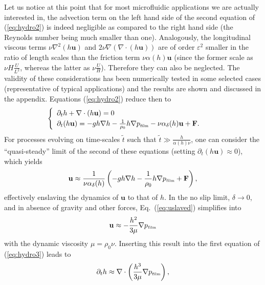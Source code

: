 Let us notice at this point that for most microfluidic applications we are actually interested in, the advection term on the left hand side of the second equation of (\ref{eq:hydro2}) is indeed negligible as compared to the right hand side (the Reynolds number \cite{reynoldsIIIExperimentalInvestigation1883,sommerfeldBeitrag1909} being much smaller than one).  
Analogously, the longitudinal viscous terms $\nu \nabla^2 (h\mathbf{u})$ and $2\nu \nabla (\nabla \cdot (h\mathbf{u}))$ are of order $\varepsilon^2$ smaller in the ratio of length scales than the friction term $\nu \alpha(h) \mathbf{u}$ (since the former scale as $\nu H\frac{U}{L^2}$, whereas the latter as $\nu \frac{U}{H}$).
Therefore they can also be neglected.
The validity of these considerations has been numerically tested in some selected cases (representative of typical applications) and the results are shown and discussed in the appendix.
Equations (\ref{eq:hydro2}) reduce then to
\begin{equation}\label{eq:hydro3}
  \begin{cases}
    \begin{array}{ll}
      \partial_t h + \nabla \cdot (h \mathbf{u})  = 0 & \\ 
      \partial_t (h \mathbf{u}) = -gh \nabla h -\frac{1}{\rho_0}h\nabla p_{\mbox{\tiny{film}}}
      - \nu \alpha_{\delta}(h) \mathbf{u} + \mathbf{F}. 
     \end{array}
   \end{cases}
\end{equation}
For processes evolving on time-scales $\tilde{t}$ such that $\tilde{t}\gg \frac{h}{\alpha(h)\nu}$, one can consider the ``quasi-steady'' limit of the second of these equations (setting $\partial_t (h\mathbf{u}) \approx 0$), which yields
\begin{equation}\label{eq:uslaved}
  \mathbf{u} \approx \frac{1}{\nu \alpha_{\delta}(h)}\left
  (-gh \nabla h -\frac{1}{\rho_0}h\nabla p_{\mbox{\tiny{film}}} + \mathbf{F}\right),
\end{equation}
effectively enslaving the dynamics of $\mathbf{u}$ to that of $h$.
In the no slip limit, $\delta \rightarrow 0$, and in absence of gravity and other forces, Eq.~(\ref{eq:uslaved}) simplifies into
\begin{equation*}
  \mathbf{u} \approx -\frac{h^2}{3 \mu}\nabla p_{\mbox{\tiny{film}}}
\end{equation*}
with the dynamic viscosity $\mu = \rho_0 \nu$. 
Inserting this result into the first equation of (\ref{eq:hydro3}) leads to
\begin{equation*}
  \partial_t h \approx \nabla \cdot \left(\frac{h^3}{3\mu}\nabla p_{\mbox{\tiny{film}}}\right),
\end{equation*}
